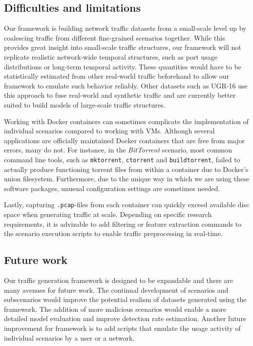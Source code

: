 \documentclass[sigconf]{acmart}
\begin{document}
\subsection{Difficulties and limitations}

Our framework is building network traffic datasets from a small-scale level up by coalescing traffic from different fine-grained scenarios together. While this provides great insight into small-scale traffic structures, our framework will not replicate realistic network-wide temporal structures, such as port usage distributions or long-term temporal activity. These quantities would have to be statistically estimated from other real-world traffic beforehand to allow our framework to emulate such behavior reliably. Other datasets such as UGR-16 use this approach to fuse real-world and synthetic traffic and are currently better suited to build models of large-scale traffic structures.

Working with Docker containers can sometimes complicate the implementation of individual scenarios compared to working with VMs. Although several applications are officially maintained Docker containers that are free from major errors, many do not. For instance, in the \textit{BitTorrent} scenario, most common command line tools, such as \texttt{mktorrent}, \texttt{ctorrent} and \texttt{buildtorrent}, failed to actually produce functioning torrent files from within a container due to Docker's union filesystem. Furthermore, due to the unique way in which we are using these software packages, unusual configuration settings are sometimes needed. %

Lastly, capturing \texttt{.pcap}-files from each container can quickly exceed available disc space when generating traffic at scale. Depending on specific research requirements, it is advizable to add filtering or feature extraction commands to the scenario execution scripts to enable traffic preprocessing in real-time.


\subsection{Future work}

Our traffic generation framework is designed to be expandable and there are many avenues for future work. The continual development of scenarios and subscenarios would improve the potential realism of datasets generated using the framework. The addition of more malicious scenarios would enable a more detailed model evaluation and improve detection rate estimation. 
Another future improvement for framework is to add scripts that emulate the usage activity of individual scenarios by a user or a network. 
\end{document}
